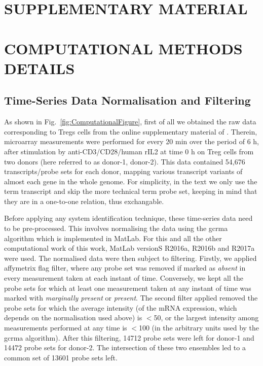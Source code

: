 \documentclass[oneside, 10pt, a4paper, twocolumn]{article}
\begin{document}




\clearpage

\newpage
\section*{SUPPLEMENTARY MATERIAL}


\section{COMPUTATIONAL METHODS DETAILS}   
\label{SI:ComputationalMethods}


\subsection{Time-Series Data Normalisation and Filtering}    
\label{SISubSection:NormAndFiltering}

As shown in Fig.~\ref{fig:ComputationalFigure}, first of all we obtained the raw data corresponding to Tregs cells from the online supplementary material of \citep{he2012plau}. Therein, microarray measurements were performed for every 20 min over the period of 6 h, after stimulation by anti-CD3/CD28/human rIL2 at time 0 h on Treg cells from two donors (here referred to as donor-1, donor-2). This data contained 54,676 transcripts/probe sets for each donor, mapping various transcript variants of almost each gene in the whole genome. For simplicity, in the text we only use the term transcript and skip the more technical term probe set, keeping in mind that they are in a one-to-one relation, thus exchangable.

Before applying any system identification technique, these time-series data need to be pre-processed. This involves normalising the data using the gcrma algorithm \citep{wu2010description} which is implemented in MatLab. For this and all the other computational work of this work, MatLab versionS R2016a, R2016b and R2017a were used. The normalised data were then subject to filtering. Firstly, we applied affymetrix flag filter, where any probe set was removed if marked as \textit{absent} in every measurement taken at each instant of time. Conversely, we kept all the probe sets for which at least one measurement taken at any instant of time was marked with \textit{marginally present} or \textit{present}. The second filter applied removed the probe sets for which the average intensity (of the mRNA expression, which depends on the normalisation used above) is $ < $50, or the largest intensity among measurements performed at any time is $ < $100 (in the arbitrary units used by the gcrma algorithm). After this filtering, 14712 probe sets were left for donor-1 and 14472 probe sets for donor-2. The intersection of these two ensembles led to a common set of 13601 probe sets left.
\end{document}
